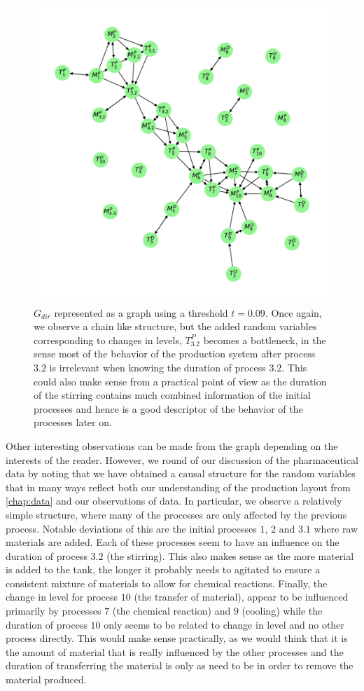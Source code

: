 \documentclass[../Thesis.tex]{subfiles}
\begin{document}
\begin{figure}[ht]
    \centering
    \includegraphics[width = .75\linewidth]{figures/Cycle data/G_dir times and levelchanges as graph - directed - 0_09.pdf}
    \caption{$G_{dir}$ represented as a graph using a threshold $t = 0.09$. Once again, we observe a chain like structure, but the added random variables corresponding to changes in levels, $T^P_{3.2}$ becomes a bottleneck, in the sense most of the behavior of the production system after process $3.2$ is irrelevant when knowing the duration of process $3.2$. This could also make sense from a practical point of view as the duration of the stirring contains much combined information of the initial processes and hence is a good descriptor of the behavior of the processes later on.}
    \label{fig:G_dir times and levelchanges - semidirected - as graph}
\end{figure}
Other interesting observations can be made from the graph depending on the interests of the reader. However, we round of our discussion of the pharmaceutical data by noting that we have obtained a causal structure for the random variables that in many ways reflect both our understanding of the production layout from \autoref{chap:data} and our observations of data. In particular, we observe a relatively simple structure, where many of the processes are only affected by the previous process. Notable deviations of this are the initial processes $1$, $2$ and $3.1$ where raw materials are added. Each of these processes seem to have an influence on the duration of process $3.2$ (the stirring). This also makes sense as the more material is added to the tank, the longer it probably needs to agitated to ensure a consistent mixture of materials to allow for chemical reactions. Finally, the change in level for process $10$ (the transfer of material), appear to be influenced primarily by processes $7$ (the chemical reaction) and $9$ (cooling) while the duration of process $10$ only seems to be related to change in level and no other process directly. This would make sense practically, as we would think that it is the amount of material that is really influenced by the other processes and the duration of transferring the material is only as need to be in order to remove the material produced.
\end{document}
